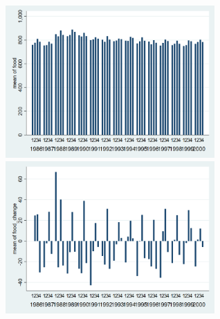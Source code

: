 \documentclass[12pt,a4paper]{article}
\begin{document}
\begin{center}
\includegraphics[width=8cm]{food_quarterly.png}
\includegraphics[width=8cm]{food_change_quarterly.png}\\
\end{center}
\end{document}
